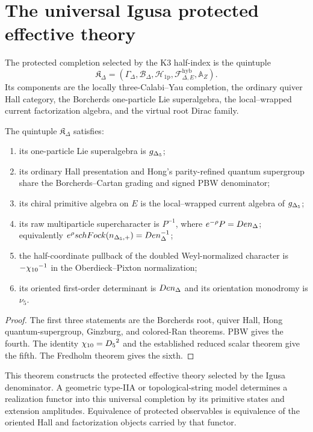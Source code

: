 \chapter{The universal Igusa protected effective theory}
\begin{definition}
The protected completion selected by the K3 half-index is the quintuple
\[
 \mathfrak K_{\Delta}=
 \left(
 \Gamma_\Delta,
 \mathcal B_\Delta,
 \mathcal H_{\mathrm{1p}},
 \mathcal F^{\mathrm{hyb}}_{\Delta,E},
 \mathbb A_Z
 \right).
\]
Its components are the locally three-Calabi--Yau completion, the ordinary quiver Hall category, the Borcherds one-particle Lie superalgebra, the local--wrapped current factorization algebra, and the virtual root Dirac family.
\end{definition}

\begin{theorem}
The quintuple $\mathfrak K_\Delta$ satisfies:
\begin{enumerate}
\item its one-particle Lie superalgebra is ${g_{\Delta_5}}$;
\item its ordinary Hall presentation and Hong's parity-refined quantum supergroup share the Borcherds--Cartan grading and signed PBW denominator;
\item its chiral primitive algebra on $E$ is the local--wrapped current algebra of ${g_{\Delta_5}}$;
\item its raw multiparticle supercharacter is $P^{-1}$, where $e^{-\rho}P=Den_{\Delta}$; equivalently $e^{\rho}schFock({n_{\Delta_5,+}})=Den_{\Delta}^{-1}$;
\item the half-coordinate pullback of the doubled Weyl-normalized character is $-{\chi_{10}}^{-1}$ in the Oberdieck--Pixton normalization;
\item its oriented first-order determinant is $Den_{\Delta}$ and its orientation monodromy is $\nu_5$.
\end{enumerate}
\end{theorem}
\begin{proof}
The first three statements are the Borcherds root, quiver Hall, Hong quantum-supergroup, Ginzburg, and colored-Ran theorems.  PBW gives the fourth.  The identity ${\chi_{10}}={D_5}^2$ and the established reduced scalar theorem give the fifth.  The Fredholm theorem gives the sixth.
\end{proof}

This theorem constructs the protected effective theory selected by the Igusa denominator.  A geometric type-IIA or topological-string model determines a realization functor into this universal completion by its primitive states and extension amplitudes.  Equivalence of protected observables is equivalence of the oriented Hall and factorization objects carried by that functor.

